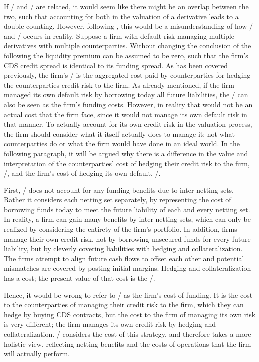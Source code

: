 \documentclass[main.tex]{subfiles}
\begin{document}
    If \DVA/ and \FVA/ are related, it would seem like there might be an overlap between the two,
    such that accounting for both in the valuation of a derivative leads to a double-counting.
    However, following \textcite{Ruiz2015XVA}, 
    this would be a misunderstanding of how \DVA/ and \FVA/ occurs in reality.
    Suppose a firm with default risk managing multiple derivatives with multiple counterparties.
    Without changing the conclusion of the following the liquidity premium can be assumed to be zero, 
    such that the firm's CDS credit spread is identical to its funding spread.
    As has been covered previously, the firm's \DVA/ is the aggregated cost
    paid by counterparties for hedging the counterparties credit risk to the firm.
    As already mentioned, if the firm managed its own default risk 
    by borrowing today all future liabilities,
    the \DVA/ can also be seen as the firm's funding costs.
    However, in reality that would not be an actual cost that the firm face,
    since it would not manage its own default risk in that manner.
    To actually account for its own credit risk in the valuation process,
    the firm should consider what it itself actually does to manage it;
    not what counterparties do or what the firm would have done in an ideal world.
    In the following paragraph, it will be argued why there is a difference 
    in the value and interpretation 
    of the counterparties' cost of hedging their credit risk to the firm, \DVA/,
    and the firm's cost of hedging its own default, \FVA/.

    First, \DVA/ does not account for any funding benefits due to inter-netting sets.
    Rather it considers each netting set separately, by representing the cost 
    of borrowing funds today to meet the future liability of each and every netting set.
    In reality, a firm can gain many benefits by inter-netting sets,
    which can only be realized by considering the entirety of the firm's portfolio.
    In addition, firms manage their own credit risk,
    not by borrowing unsecured funds for every future liability,
    but by cleverly covering liabilities
    with hedging and collateralization.
    The firms attempt to align future cash flows to offset each other
    and potential mismatches are covered by posting initial margins. 
    Hedging and collateralization has a cost; 
    the present value of that cost is the \FVA/.

    Hence, it would be wrong to refer to \DVA/ as the firm's cost of funding.
    It is the cost to the counterparties of managing their credit risk to the firm,
    which they can hedge by buying CDS contracts,
    but the cost to the firm of managing its own risk is very different;
    the firm manages its own credit risk by hedging and collateralization.
    \FVA/ considers the cost of this strategy, and therefore takes a more holistic view, 
    reflecting netting benefits and the costs of operations that the firm will actually perform.
\end{document}
